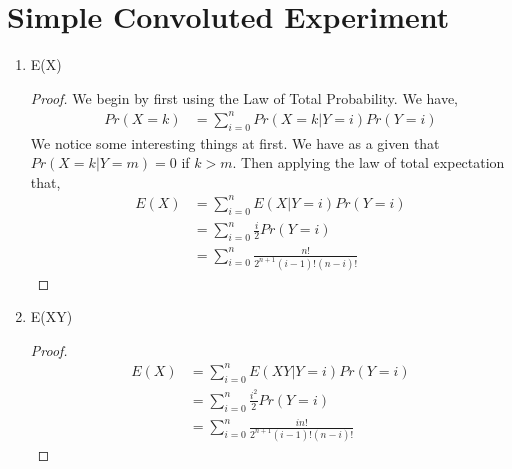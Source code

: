 \documentclass{article}
\begin{document}
\section{Simple Convoluted Experiment}
    \begin{enumerate}[label=\roman*)]
        \item E(X)
            \begin{proof}
                We begin by first using the Law of Total Probability. We have, 
                \begin{align*}
                    Pr(X = k) &= \sum_{i=0}^n Pr(X = k|Y = i) Pr(Y = i)
                \end{align*}
                We notice some interesting things at first. We have as a given
                that $Pr(X = k | Y = m) = 0$ if $k > m$. Then applying the law
                of total expectation that, 
                \begin{align*}
                    E(X) &=  \sum_{i=0}^n E(X|Y=i)Pr(Y=i)\\
                    &= \sum_{i=0}^n \frac{i}{2}Pr(Y=i)\\
                    &= \sum_{i=0}^n \frac{n!}{2^{n+1}(i-1)!(n-i)!}
                \end{align*}
            \end{proof}
        \item E(XY)
            \begin{proof}
                \begin{align*}
                    E(X) &=  \sum_{i=0}^n E(XY|Y=i)Pr(Y=i)\\
                    &= \sum_{i=0}^n \frac{i^2}{2}Pr(Y=i)\\
                    &= \sum_{i=0}^n \frac{in!}{2^{n+1}(i-1)!(n-i)!}
                \end{align*}

            \end{proof}
    \end{enumerate}
\end{document}
